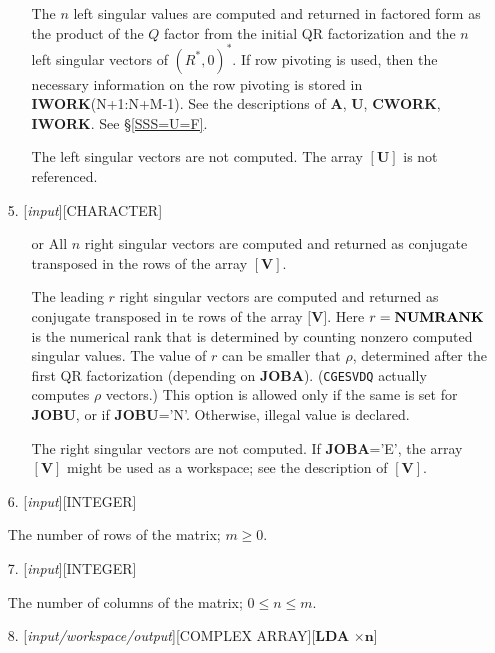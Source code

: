 \documentclass[12pt, a4paper, final]{article}
\numberwithin{equation}{section}
\begin{document}
\begin{itemize}
\begin{itemize}
		\item[\framebox{'F'}] The $n$ left singular values are computed and returned in factored form as the product of the $Q$ factor from the initial QR factorization and the
		$n$ left singular vectors of $(R^* , 0)^*$. If row pivoting is used, then the necessary information on the row pivoting is stored in \textbf{IWORK}(N+1:N+M-1).	
		See the descriptions of $\mathbf{A}$, 
		$\mathbf{U}$, \textbf{CWORK}, \textbf{IWORK}.  See \S \ref{SSS=U=F}.
		\item[\framebox{'N'}] The left singular vectors are not computed. The array $\mathbf{[U]}$ is not referenced. 
	\end{itemize}
	
	\item[5.]  [\emph{input}][{\sc CHARACTER}]
	\begin{itemize}
		\item[\framebox{'A'}] or  All $n$ right singular vectors are computed and returned as conjugate transposed in the rows of the array $\mathbf{[V]}$.
		\item[\framebox{'R'}] The leading $r$ right singular vectors are computed and returned as conjugate transposed in te rows of the array $\textbf{[V]}$.  Here $r=\mbox{\textbf{NUMRANK}}$ is the numerical rank that is determined by counting nonzero computed singular values. The value of $r$ can be smaller that $\rho$, determined after the first QR factorization (depending on \textbf{JOBA}). (\texttt{CGESVDQ} actually computes $\rho$ vectors.)
		This option is allowed only if the same is set for \textbf{JOBU}, or if \textbf{JOBU}='N'. Otherwise, illegal value is declared.
		\item[\framebox{'N'}] The right singular vectors are not computed. If \textbf{JOBA}='E', the array $\mathbf{[V]}$ might be used as a workspace; see the description of $\mathbf{[V]}$.
	\end{itemize}
	
	\item[6.]  [\emph{input}][{\sc INTEGER}]
	
	The number of rows of the matrix; $m\geq 0$.
	
	\item[7.]  [\emph{input}][{\sc INTEGER}]
	
	The number of columns of the matrix; $0\leq n \leq m$.
	
	\item[8.]  [\emph{input/workspace/output}][{\sc COMPLEX ARRAY}][\textbf{LDA} $\times \mathbf{n}$]
	

\end{itemize}
\end{document}
